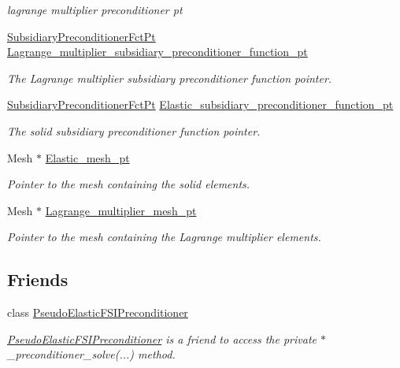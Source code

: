 \begin{DoxyCompactItemize}
\begin{DoxyCompactList}\small\item\em lagrange multiplier preconditioner pt \end{DoxyCompactList}\item 
\hyperlink{classoomph_1_1PseudoElasticPreconditioner_a1462e1ef48ed2668c06dfd36c783d1a5}{Subsidiary\+Preconditioner\+Fct\+Pt} \hyperlink{classoomph_1_1PseudoElasticPreconditioner_a0206c1e2da88da8948f2d560e8376aa3}{Lagrange\+\_\+multiplier\+\_\+subsidiary\+\_\+preconditioner\+\_\+function\+\_\+pt}
\begin{DoxyCompactList}\small\item\em The Lagrange multiplier subsidiary preconditioner function pointer. \end{DoxyCompactList}\item 
\hyperlink{classoomph_1_1PseudoElasticPreconditioner_a1462e1ef48ed2668c06dfd36c783d1a5}{Subsidiary\+Preconditioner\+Fct\+Pt} \hyperlink{classoomph_1_1PseudoElasticPreconditioner_aa3ca9f5ccba13b8a2038afb386f73b2d}{Elastic\+\_\+subsidiary\+\_\+preconditioner\+\_\+function\+\_\+pt}
\begin{DoxyCompactList}\small\item\em The solid subsidiary preconditioner function pointer. \end{DoxyCompactList}\item 
Mesh $\ast$ \hyperlink{classoomph_1_1PseudoElasticPreconditioner_aba765545c62b9dc52f7c2ea25ea13177}{Elastic\+\_\+mesh\+\_\+pt}
\begin{DoxyCompactList}\small\item\em Pointer to the mesh containing the solid elements. \end{DoxyCompactList}\item 
Mesh $\ast$ \hyperlink{classoomph_1_1PseudoElasticPreconditioner_a9d167073db4ade6ba70f036c4ab926dd}{Lagrange\+\_\+multiplier\+\_\+mesh\+\_\+pt}
\begin{DoxyCompactList}\small\item\em Pointer to the mesh containing the Lagrange multiplier elements. \end{DoxyCompactList}\end{DoxyCompactItemize}
\subsection*{Friends}
\begin{DoxyCompactItemize}
\item 
class \hyperlink{classoomph_1_1PseudoElasticPreconditioner_aaaea2b4795566f81945597254305249d}{Pseudo\+Elastic\+F\+S\+I\+Preconditioner}
\begin{DoxyCompactList}\small\item\em \hyperlink{classoomph_1_1PseudoElasticFSIPreconditioner}{Pseudo\+Elastic\+F\+S\+I\+Preconditioner} is a friend to access the private $\ast$\+\_\+preconditioner\+\_\+solve(...) method. \end{DoxyCompactList}\end{DoxyCompactItemize}


